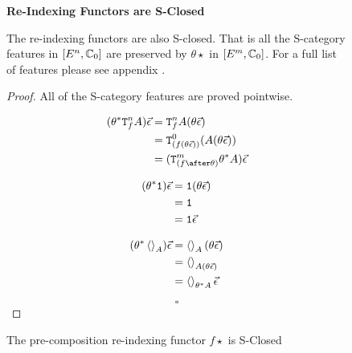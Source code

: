 \documentclass{Report}
\begin{document}
\begin{figure}
    
    \begin{framed}
        \centering
        \textbf{Re-Indexing Functors are S-Closed}
                
        \begin{theorem}
            The re-indexing functors are also S-closed. That is all the S-category features in $[E^n, \mathbb{C}_0]$ are preserved by $\theta\star$ in $[E^m, \mathbb{C}_0]$. For a full list of features please see appendix \needsRef.
        \end{theorem}
        
        
        \begin{proof}
            All of the S-category features are proved pointwise.
        
            \begin{align}
                (\theta\star\Tn{f}{A})\ev & = \Tn{f}{A}(\theta\ev) \\
                & = \Tz{(f(\theta\ev))}{(A(\theta\ev))}\\
                & = (\Tm{(f\after\theta)}{\theta\star A})\ev\\
            \end{align}
        
            
        \begin{align}
            (\theta^* \texttt{1})\vec{\epsilon} & = \texttt{1}(\theta\vec{\epsilon})\\
            & = \texttt{1} \\
            & = \texttt{1} \vec{\epsilon}\\
        \end{align}
        
        \begin{align}
            (\theta^*\left\langle\right\rangle_{A})\vec{\epsilon} & = \left\langle\right\rangle_{A}(\theta\vec{\epsilon})\\
            & = \left\langle\right\rangle_{A(\theta\vec{\epsilon})}\\
            & = \left\langle\right\rangle_{\theta^* A}\vec{\epsilon}
        \end{align}
        
            $$\square$$
        \end{proof}
    \end{framed}
    \caption{The pre-composition re-indexing functor $f\star$ is S-Closed}
    \label{PrecompositionSClosure}
\end{figure}
\end{document}
